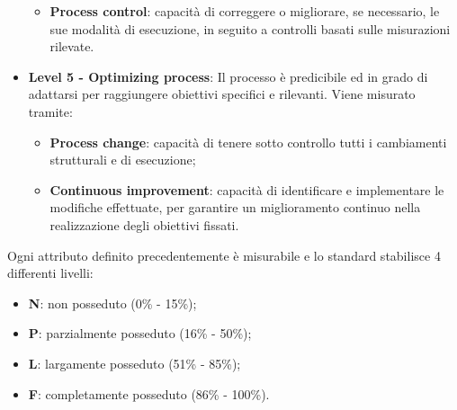 \begin{itemize}
\begin{itemize}
\item\textbf{Process control}: capacità di correggere o migliorare, se necessario,  le sue modalità di esecuzione, in seguito a controlli basati sulle misurazioni rilevate.
\end{itemize}
\item\textbf{Level 5 - Optimizing process}: Il processo è predicibile ed in grado di adattarsi per raggiungere obiettivi specifici e rilevanti. Viene misurato tramite:
\begin{itemize}
\item\textbf{Process change}: capacità di tenere sotto controllo tutti i cambiamenti strutturali e di esecuzione;
\item\textbf{Continuous improvement}: capacità di identificare
e implementare le modifiche effettuate, per garantire un miglioramento continuo nella realizzazione degli obiettivi fissati.
\end{itemize}
\end{itemize} 	

Ogni attributo definito precedentemente è misurabile e lo standard stabilisce
4 differenti livelli:
\begin{itemize}
\item\textbf{N}: non posseduto (0\% - 15\%);
\item\textbf{P}: parzialmente posseduto (16\% - 50\%);
\item\textbf{L}: largamente posseduto (51\% - 85\%);
\item\textbf{F}: completamente posseduto (86\% - 100\%).
\end{itemize}